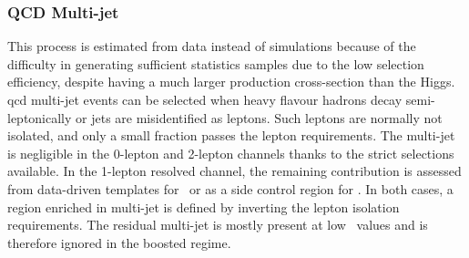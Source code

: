 \subsubsection{QCD Multi-jet}
This process is estimated from data instead of simulations because of the difficulty in generating sufficient statistics samples due to the low selection efficiency, despite having a much larger production cross-section than the Higgs. \gls{qcd} multi-jet events can be selected when heavy flavour hadrons decay semi-leptonically or jets are misidentified as leptons. Such leptons are normally not isolated, and only a small fraction passes the lepton requirements. The multi-jet is negligible in the 0-lepton and 2-lepton channels thanks to the strict selections available. In the 1-lepton resolved channel, the remaining contribution is assessed from data-driven templates for \vhb\ or as a side control region for \vhc. In both cases, a region enriched in multi-jet is defined by inverting the lepton isolation requirements. The residual multi-jet is mostly present at low \ptv\ values and is therefore ignored in the boosted regime. \\



